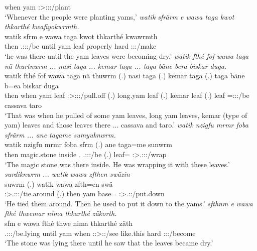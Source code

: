 \begin{exe}
	when yam \Stpl:\Sbj>\Stpl:\Obj:\Pst:\Dur/plant\\
	\trans `Whenever the people were planting yams,'
	\emph{watik sfrärm e wawa taga kwot thkarthé kwafiyokwrmth.}\\
	\gll watik sfrm e wawa taga kwot thkarthé kwawrmth\\ 
	then \Tsg.\Masc:\Sbj:\Pst:\Dur/be until yam leaf properly hard \Stpl:\Sbj:\Pst:\Dur/make\\
	\trans `he was there until the yam leaves were becoming dry.'
	\emph{watik fthé fof wawa taga nä thurtnwrm ... nasi taga ... kemar taga ... taga bäne bera biskar duga.}\\
	\gll watik fthé fof wawa taga nä thuwrm (.) nasi taga (.) kemar taga (.) taga bäne b=ea biskar duga\\ 
	then when \Emph{} yam leaf \Indf{} \Sg:\Sbj>\Stpl:\Obj:\Pst:\Dur/pull.off (.) long.yam leaf (.) kemar leaf (.) leaf \Recog{} \Med=\Stpl:\Sbj:\Pst:\Ipfv/be cassava taro\\
	\trans `That was when he pulled of some yam leaves, long yam leaves, kemar (type of yam) leaves and those leaves there ... cassava and taro.'
	\emph{watik nzigfu mrmr foba sfrärm ... ane tagame sumyuknwrm.}\\
	\gll watik nzigfu mrmr foba sfrm (.) ane taga=me sunwrm\\ 
	then magic.stone inside \Dist.\Abl{} \Tsg.\Masc:\Sbj:\Pst:\Dur/be (.) \Dem{} leaf=\Ins{} \Sg:\Sbj>\Tsg.\Masc:\Obj:\Pst:\Dur/wrap\\
	\trans `The magic stone was there inside. He was wrapping it with these leaves.'
	\emph{surdiknwrm ... watik wawa zfthen swäzin}\\
	\gll suwrm (.) watik wawa zfth=en swä\\ 
	\Sg:\Sbj>\Tsg.\Masc:\Obj:\Pst:\Dur/tie.around (.) then yam base=\Loc{} \Stsg:\Sbj>\Tsg.\Masc:\Obj:\Iter/put.down\\
	\trans `He tied them around. Then he used to put it down to the yams.'
	\emph{sfthnm e wawa fthé thwemar nima thkarthé zäkorth.}\\
	\gll sfm e wawa fthé thwe nima thkarthé zäth\\ 
	\Tsg.\Masc:\Sbj:\Pst:\Dur/be.lying until yam when \Stsg:\Sbj:>\Stpl:\Obj:\Iter/see like.this hard \Stpl:\Sbj:\Pst:\Pfv/become\\
	\trans `The stone was lying there until he saw that the leaves became dry.'

\end{exe}
